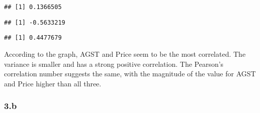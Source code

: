 \documentclass[
]{article}
\newenvironment{Shaded}{\begin{snugshade}}{\end{snugshade}}
\newcommand{\CommentTok}[1]{\textcolor[rgb]{0.56,0.35,0.01}{\textit{#1}}}
\newcommand{\FunctionTok}[1]{\textcolor[rgb]{0.00,0.00,0.00}{#1}}
\newcommand{\NormalTok}[1]{#1}
\newcommand{\OtherTok}[1]{\textcolor[rgb]{0.56,0.35,0.01}{#1}}
\newcommand{\SpecialCharTok}[1]{\textcolor[rgb]{0.00,0.00,0.00}{#1}}
\begin{document}
\begin{Shaded}
\end{Shaded}

\begin{verbatim}
## [1] 0.1366505
\end{verbatim}

\begin{Shaded}
\end{Shaded}

\begin{verbatim}
## [1] -0.5633219
\end{verbatim}

\begin{Shaded}
\end{Shaded}

\begin{verbatim}
## [1] 0.4477679
\end{verbatim}

According to the graph, AGST and Price seem to be the most correlated.
The variance is smaller and has a strong positive correlation. The
Pearson's correlation number suggests the same, with the magnitude of
the value for AGST and Price higher than all three.

\hypertarget{b-2}{%
\subsubsection{3.b}\label{b-2}}

\begin{Shaded}
\end{Shaded}
\end{document}
